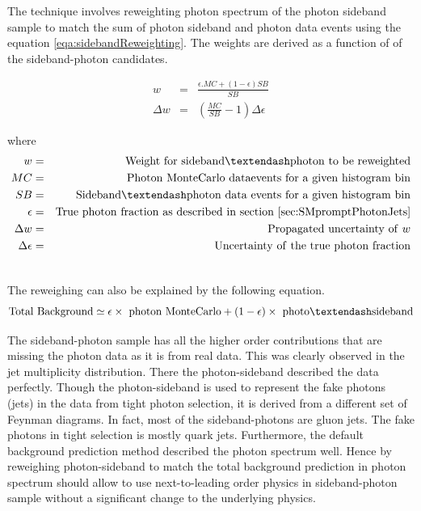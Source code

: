 \documentclass[11pt]{article}
\begin{document}
The technique involves reweighting photon \et spectrum of the photon sideband sample to match the sum of photon sideband and photon \MC data events using the equation \ref{eqa:sidebandReweighting}. The weights are derived as a function of \et of the sideband-photon candidates.


\begin{center}
 \begin{eqnarray}
  \nonumber
  w &=& \frac{\epsilon.MC+(1-\epsilon) SB}{SB}\\
  \Delta w &=& (\frac{MC}{SB}-1)\Delta \epsilon
 \label{eqa:sidebandReweighting}
 \end{eqnarray}
\end{center}


\noindent where
\begin{eqnarray}
  \nonumber
  w &=& \mathrm{Weight~for~sideband\textendash photon~to~be~reweighted}\\ \nonumber
  MC &=& \mathrm{Photon~\MC~data events~for~a~given~histogram~bin}\\ \nonumber
  SB &=& \mathrm{Sideband\textendash photon~data~events~for~a~given~histogram~bin}\\ \nonumber
 \epsilon &=& \mathrm{True~photon~fraction~as~described~in~section~\ref{sec:SMpromptPhotonJets}}\\ \nonumber
 \Delta w &=& \mathrm{Propagated~uncertainty~of}~w\\ \nonumber
  \Delta\epsilon &=& \mathrm{Uncertainty~of~the~true~photon~fraction}\\ \nonumber
\end{eqnarray}

The reweighing can also be explained by the following equation.
\begin{equation}
 \mathrm{Total~Background\simeq \epsilon\times~photon~\MC+(1-\epsilon)\times~photo\textendash sideband}
\end{equation}


The sideband-photon sample has all the higher order contributions that are missing the photon \MC data as it is from real data. This was clearly observed in the jet multiplicity distribution. There the photon-sideband described the data perfectly. Though the photon-sideband is used to represent the fake photons (jets) in the data from tight photon selection, it is derived from a different set of Feynman diagrams. In fact, most of the sideband-photons are gluon jets. The fake photons in tight selection is mostly quark jets. Furthermore, the default background prediction method described the photon \et spectrum well. Hence by reweighing photon-sideband to match the total background prediction in photon \et spectrum should allow to use next-to-leading order physics in sideband-photon sample without a significant change to the underlying physics.
\end{document}
